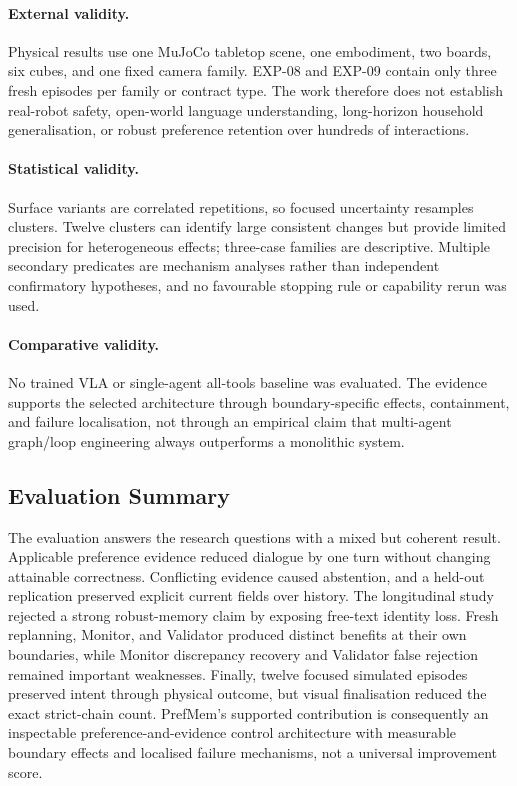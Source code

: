 \documentclass{article}
\begin{document}
\paragraph{External validity.}
Physical results use one MuJoCo tabletop scene, one embodiment, two boards, six
cubes, and one fixed camera family. EXP-08 and EXP-09 contain only three fresh
episodes per family or contract type. The work therefore does not establish
real-robot safety, open-world language understanding, long-horizon household
generalisation, or robust preference retention over hundreds of interactions.

\paragraph{Statistical validity.}
Surface variants are correlated repetitions, so focused uncertainty resamples
clusters. Twelve clusters can identify large consistent changes but provide
limited precision for heterogeneous effects; three-case families are
descriptive. Multiple secondary predicates are mechanism analyses rather than
independent confirmatory hypotheses, and no favourable stopping rule or
capability rerun was used.

\paragraph{Comparative validity.}
No trained VLA or single-agent all-tools baseline was evaluated. The evidence
supports the selected architecture through boundary-specific effects,
containment, and failure localisation, not through an empirical claim that
multi-agent graph/loop engineering always outperforms a monolithic system.

\subsection{Evaluation Summary}
\label{subsec:evaluation-summary}

The evaluation answers the research questions with a mixed but coherent
result. Applicable preference evidence reduced dialogue by one turn without
changing attainable correctness. Conflicting evidence caused abstention, and a
held-out replication preserved explicit current fields over history. The
longitudinal study rejected a strong robust-memory claim by exposing free-text
identity loss. Fresh replanning, Monitor, and Validator produced distinct
benefits at their own boundaries, while Monitor discrepancy recovery and
Validator false rejection remained important weaknesses. Finally, twelve
focused simulated episodes preserved intent through physical outcome, but
visual finalisation reduced the exact strict-chain count. PrefMem's supported
contribution is consequently an inspectable preference-and-evidence control
architecture with measurable boundary effects and localised failure mechanisms,
not a universal improvement score.
\end{document}

